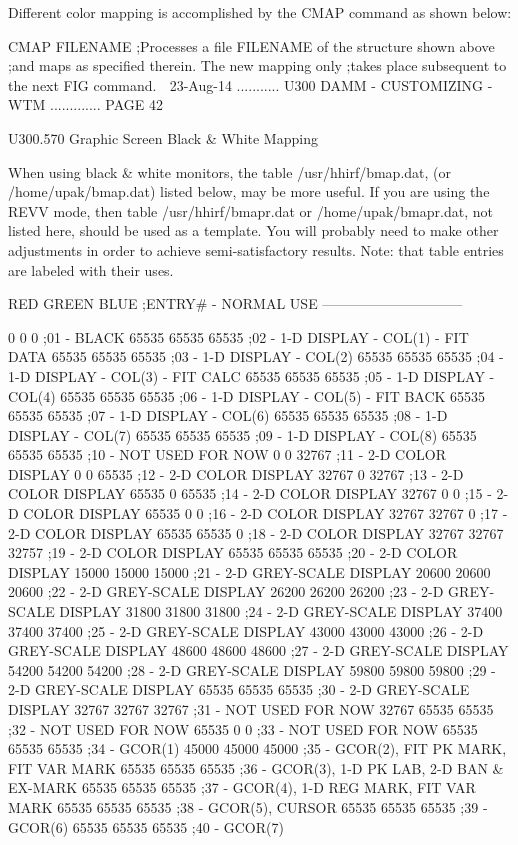    Different color mapping is accomplished by the CMAP command as shown below:
 
   CMAP FILENAME  ;Processes a file FILENAME of the structure shown above
                  ;and maps as  specified  therein.  The new mapping only
                  ;takes place subsequent to the next FIG command.
    
   23-Aug-14 ........... U300  DAMM - CUSTOMIZING - WTM ............. PAGE  42
 
   U300.570  Graphic Screen Black & White Mapping
 
   When  using  black  &  white  monitors,  the table /usr/hhirf/bmap.dat, (or
   /home/upak/bmap.dat) listed below, may be more useful.  If  you  are  using
   the  REVV  mode,  then  table /usr/hhirf/bmapr.dat or /home/upak/bmapr.dat,
   not listed here, should be used as a template. You will  probably  need  to
   make  other  adjustments  in  order  to  achieve semi-satisfactory results.
   Note: that table entries are labeled with their uses.
 
       RED  GREEN   BLUE   ;ENTRY# - NORMAL USE ------------------------------
 
         0      0      0  ;01 - BLACK
     65535  65535  65535  ;02 - 1-D DISPLAY - COL(1) - FIT DATA
     65535  65535  65535  ;03 - 1-D DISPLAY - COL(2)
     65535  65535  65535  ;04 - 1-D DISPLAY - COL(3) - FIT CALC
     65535  65535  65535  ;05 - 1-D DISPLAY - COL(4)
     65535  65535  65535  ;06 - 1-D DISPLAY - COL(5) - FIT BACK
     65535  65535  65535  ;07 - 1-D DISPLAY - COL(6)
     65535  65535  65535  ;08 - 1-D DISPLAY - COL(7)
     65535  65535  65535  ;09 - 1-D DISPLAY - COL(8)
     65535  65535  65535  ;10 - NOT USED FOR NOW
         0      0  32767  ;11 - 2-D COLOR DISPLAY
         0      0  65535  ;12 - 2-D COLOR DISPLAY
     32767      0  32767  ;13 - 2-D COLOR DISPLAY
     65535      0  65535  ;14 - 2-D COLOR DISPLAY
     32767      0      0  ;15 - 2-D COLOR DISPLAY
     65535      0      0  ;16 - 2-D COLOR DISPLAY
     32767  32767      0  ;17 - 2-D COLOR DISPLAY
     65535  65535      0  ;18 - 2-D COLOR DISPLAY
     32767  32767  32757  ;19 - 2-D COLOR DISPLAY
     65535  65535  65535  ;20 - 2-D COLOR DISPLAY
     15000  15000  15000  ;21 - 2-D GREY-SCALE DISPLAY
     20600  20600  20600  ;22 - 2-D GREY-SCALE DISPLAY
     26200  26200  26200  ;23 - 2-D GREY-SCALE DISPLAY
     31800  31800  31800  ;24 - 2-D GREY-SCALE DISPLAY
     37400  37400  37400  ;25 - 2-D GREY-SCALE DISPLAY
     43000  43000  43000  ;26 - 2-D GREY-SCALE DISPLAY
     48600  48600  48600  ;27 - 2-D GREY-SCALE DISPLAY
     54200  54200  54200  ;28 - 2-D GREY-SCALE DISPLAY
     59800  59800  59800  ;29 - 2-D GREY-SCALE DISPLAY
     65535  65535  65535  ;30 - 2-D GREY-SCALE DISPLAY
     32767  32767  32767  ;31 - NOT USED FOR NOW
     32767  65535  65535  ;32 - NOT USED FOR NOW
     65535      0      0  ;33 - NOT USED FOR NOW
     65535  65535  65535  ;34 - GCOR(1)
     45000  45000  45000  ;35 - GCOR(2), FIT PK MARK,  FIT VAR MARK
     65535  65535  65535  ;36 - GCOR(3), 1-D PK LAB, 2-D BAN & EX-MARK
     65535  65535  65535  ;37 - GCOR(4), 1-D REG MARK, FIT VAR MARK
     65535  65535  65535  ;38 - GCOR(5), CURSOR
     65535  65535  65535  ;39 - GCOR(6)
     65535  65535  65535  ;40 - GCOR(7)
